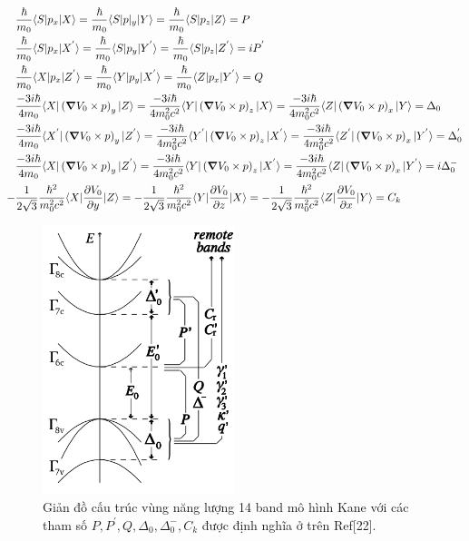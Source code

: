 \begin{align}
&\frac{\hbar}{m_0}\langle S|p_x|X\rangle = \frac{\hbar}{m_0}\langle S|p|_y|Y\rangle = \frac{\hbar}{m_0}\langle S|p_z|Z\rangle = P \notag \\
&\frac{\hbar}{m_0}\langle S|p_x|X^{'}\rangle = \frac{\hbar}{m_0}\langle S|p_y|Y^{'}\rangle = \frac{\hbar}{m_0}\langle S|p_z|Z^{'}\rangle = iP^{'} \notag\\
&\frac{\hbar}{m_0}\langle X|p_x|Z^{'}\rangle = \frac{\hbar}{m_0}\langle Y|p_y|X^{'}\rangle = \frac{\hbar}{m_0}\langle Z|p_x|Y^{'}\rangle = Q \notag\\
&\frac{-3i\hbar}{4m_0} \langle X|\left(\boldsymbol{\nabla}V_0\times p \right)_{y}|Z\rangle = \frac{-3i\hbar}{4m_0^2c^2}\langle Y|\left(\boldsymbol{\nabla}V_0\times p\right)_z|X\rangle = \frac{-3i\hbar}{4m_0^2c^2}\langle Z|\left(\boldsymbol{\nabla}V_0\times p\right)_x|Y\rangle =\Delta_0 \notag\\
&\frac{-3i\hbar}{4m_0} \langle X^{'}|\left(\boldsymbol{\nabla}V_0\times p \right)_{y}|Z^{'}\rangle = \frac{-3i\hbar}{4m_0^2c^2}\langle Y^{'}|\left(\boldsymbol{\nabla}V_0\times p\right)_z|X^{'}\rangle = \frac{-3i\hbar}{4m_0^2c^2}\langle Z^{'}|\left(\boldsymbol{\nabla}V_0\times p\right)_x|Y^{'}\rangle =\Delta_0^{'} \notag\\
&\frac{-3i\hbar}{4m_0} \langle X|\left(\boldsymbol{\nabla}V_0\times p \right)_{y}|Z^{'}\rangle = \frac{-3i\hbar}{4m_0^2c^2}\langle Y|\left(\boldsymbol{\nabla}V_0\times p\right)_z|X^{'}\rangle = \frac{-3i\hbar}{4m_0^2c^2}\langle Z|\left(\boldsymbol{\nabla}V_0\times p\right)_x|Y^{'}\rangle =i\Delta_0^{-} \notag \\
-&\frac{1}{2\sqrt{3}}\frac{\hbar^2}{m_0^2c^2}\langle X|\frac{\partial V_0}{\partial y}|Z\rangle = -\frac{1}{2\sqrt{3}}\frac{\hbar^2}{m_0^2c^2}\langle Y|\frac{\partial V_0}{\partial z}|X\rangle = -\frac{1}{2\sqrt{3}}\frac{\hbar^2}{m_0^2c^2}\langle Z|\frac{\partial V_0}{\partial x}|Y\rangle = C_k
\end{align}

\begin{figure}[hc]
\centering
\includegraphics[width=0.50\textwidth]{./Figures/band.png}
\caption[Giản đồ cấu trúc vùng năng lượng 14 band mô hình Kane]{Giản đồ cấu trúc vùng năng lượng 14 band mô hình Kane với các tham số $P,P^{'},Q,\Delta_0,\Delta_0^{-},C_k $ được định nghĩa ở trên Ref[22].}
\end{figure}


